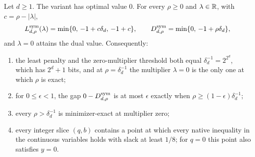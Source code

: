 \begin{proposition}\label{prop:symmetric}
Let $d\ge1$. The variant has optimal value $0$. For every $\rho\ge0$ and
$\lambda\in\mathbb R$, with $c=\rho-|\lambda|$,
\begin{equation}\label{eq:symdual}
 L^{\rm sym}_{d,\rho}(\lambda)=\min\{0,\,-1+c\delta_d,\,-1+c\},\qquad
 D^{\rm sym}_{d,\rho}=\min\{0,\,-1+\rho\delta_d\},
\end{equation}
and $\lambda=0$ attains the dual value. Consequently:
\begin{enumerate}
\item[(a)] the least penalty and the zero-multiplier threshold both equal
$\delta_d^{-1}=2^{2^d}$, which has $2^d+1$ bits, and at
$\rho=\delta_d^{-1}$ the multiplier $\lambda=0$ is the only one at which
$\rho$ is exact;
\item[(b)] for $0\le\epsilon<1$, the gap $0-D^{\rm sym}_{d,\rho}$ is at
most $\epsilon$ exactly when $\rho\ge(1-\epsilon)\delta_d^{-1}$;
\item[(c)] every $\rho>\delta_d^{-1}$ is minimizer-exact at multiplier
zero;
\item[(d)] every integer slice $(q,b)$ contains a point at which every
native inequality in the continuous variables holds with slack at least
$1/8$; for $q=0$ this point also satisfies $y=0$.
\end{enumerate}
\end{proposition}

